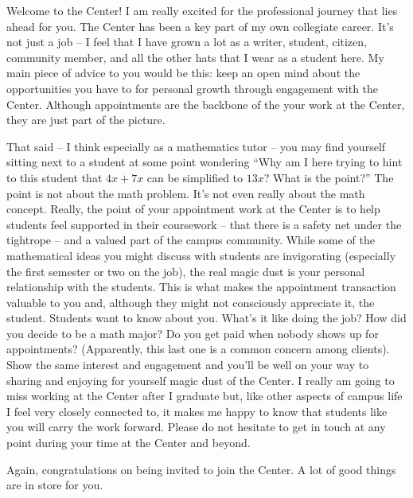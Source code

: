 Welcome to the Center! I am really excited for the professional journey that lies ahead for you. The Center has been a key part of my own collegiate career. It's not just a job -- I feel that I have grown a lot as a writer, student, citizen, community member, and all the other hats that I wear as a student here. My main piece of advice to you would be this: keep an open mind about the opportunities you have to for personal growth through engagement with the Center. Although appointments are the backbone of the your work at the Center, they are just part of the picture.

That said -- I think especially as a mathematics tutor -- you may find yourself sitting next to a student at some point wondering ``Why am I here trying to hint to this student that $4x + 7x$ can be simplified to $13x$? What is the point?'' The point is not about the math problem. It's not even really about the math concept. Really, the point of your appointment work at the Center is to help students feel supported in their coursework -- that there is a safety net under the tightrope -- and a valued part of the campus community. While some of the mathematical ideas you might discuss with students are invigorating (especially the first semester or two on the job), the real magic dust is your personal relationship with the students. This is what makes the appointment transaction valuable to you and, although they might not consciously appreciate it, the student. Students want to know about you. What's it like doing the job? How did you decide to be a math major? Do you get paid when nobody shows up for appointments? (Apparently, this last one is a common concern among clients). Show the same interest and engagement and you'll be well on your way to sharing and enjoying for yourself magic dust of the Center. I really am going to miss working at the Center after I graduate but, like other aspects of campus life I feel very closely connected to, it makes me happy to know that students like you will carry the work forward. Please do not hesitate to get in touch at any point during your time at the Center and beyond.

Again, congratulations on being invited to join the Center. A lot of good things are in store for you.